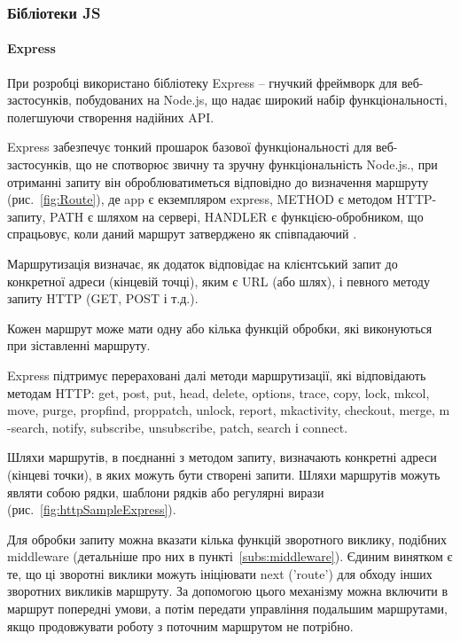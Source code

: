 \subsubsection{Бібліотеки JS}

\paragraph{Express} \label{par:Express}

При розробці використано бібліотеку Express -- гнучкий фреймворк для веб-застосунків, побудованих на Node.js, що надає широкий набір функціональності, полегшуючи створення надійних API.

Express забезпечує тонкий прошарок базової функціональності для веб-застосунків, що не спотворює звичну та зручну функціональність Node.js., при отриманні запиту він оброблюватиметься відповідно до визначення маршруту (рис.~\ref{fig:Route}), де app є екземпляром express, METHOD є методом HTTP-запиту, PATH є шляхом на сервері, HANDLER є функцією-обробником, що спрацьовує, коли даний маршрут затверджено як співпадаючий \cite{hahn2016express}.

Маршрутизація визначає, як додаток відповідає на клієнтський запит до конкретної адреси (кінцевій точці), яким є URL (або шлях), і певного методу запиту HTTP (GET, POST і т.д.).

Кожен маршрут може мати одну або кілька функцій обробки, які виконуються при зіставленні маршруту.

Express підтримує перераховані далі методи маршрутизації, які відповідають методам HTTP: get, post, put, head, delete, options, trace, copy, lock, mkcol, move, purge, propfind, proppatch, unlock, report, mkactivity, checkout, merge, m -search, notify, subscribe, unsubscribe, patch, search і connect.

Шляхи маршрутів, в поєднанні з методом запиту, визначають конкретні адреси (кінцеві точки), в яких можуть бути створені запити. Шляхи маршрутів можуть являти собою рядки, шаблони рядків або регулярні вирази (рис.~\ref{fig:httpSampleExpress}).


Для обробки запиту можна вказати кілька функцій зворотного виклику, подібних middleware (детальніше про них в пункті~\ref{subs:middleware}). Єдиним винятком є те, що ці зворотні виклики можуть ініціювати next ('route') для обходу інших зворотних викликів маршруту. За допомогою цього механізму можна включити в маршрут попередні умови, а потім передати управління подальшим маршрутами, якщо продовжувати роботу з поточним маршрутом не потрібно.

